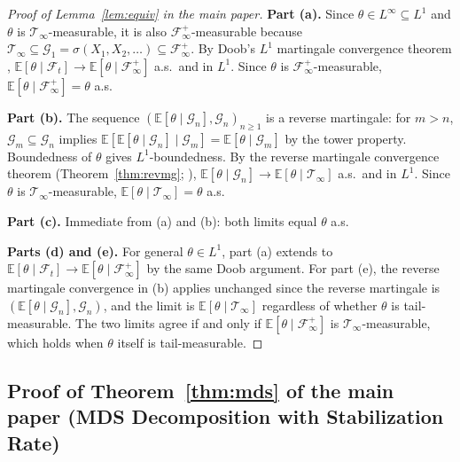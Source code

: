 \documentclass[bj,authoryear]{imsart}
\theoremstyle{plain}
\theoremstyle{definition}
\newcommand{\E}{\mathbb{E}}
\newcommand{\F}{\mathcal{F}}
\newcommand{\G}{\mathcal{G}}
\newcommand{\Tsig}{\mathcal{T}_\infty}
\newcommand{\given}{\mid}
\begin{document}
\begin{proof}[Proof of Lemma~\ref{lem:equiv} in the main paper]
  \textbf{Part (a).}
  Since $\theta \in L^\infty \subseteq L^1$ and $\theta$ is
  $\Tsig$-measurable, it is also $\F_\infty^+$-measurable because
  $\Tsig \subseteq \G_1 = \sigma(X_1,X_2,\ldots) \subseteq \F_\infty^+$.
  By Doob's $L^1$ martingale convergence theorem \citep{doob1953stochastic},
  $\E[\theta\given\F_t] \to \E[\theta\given\F_\infty^+]$ a.s.\ and in $L^1$.
  Since $\theta$ is $\F_\infty^+$-measurable,
  $\E[\theta\given\F_\infty^+] = \theta$ a.s.

  \textbf{Part (b).}
  The sequence $(\E[\theta\given\G_n], \G_n)_{n\geq 1}$ is a reverse
  martingale: for $m > n$, $\G_m \subseteq \G_n$ implies
  $\E[\E[\theta\given\G_n]\given\G_m] = \E[\theta\given\G_m]$ by the
  tower property.
  Boundedness of $\theta$ gives $L^1$-boundedness.
  By the reverse martingale convergence theorem
  (Theorem~\ref{thm:revmg}; \citealt{doob1953stochastic}),
  $\E[\theta\given\G_n] \to \E[\theta\given\Tsig]$ a.s.\ and in $L^1$.
  Since $\theta$ is $\Tsig$-measurable, $\E[\theta\given\Tsig] = \theta$
  a.s.

  \textbf{Part (c).}
  Immediate from (a) and (b): both limits equal $\theta$ a.s.

  \textbf{Parts (d) and (e).}
  For general $\theta \in L^1$, part (a) extends to
  $\E[\theta\given\F_t]\to\E[\theta\given\F_\infty^+]$ by the same Doob
  argument.  For part (e), the reverse martingale convergence in (b)
  applies unchanged since the reverse martingale is
  $(\E[\theta\given\G_n], \G_n)$, and the limit is
  $\E[\theta\given\Tsig]$ regardless of whether $\theta$ is
  tail-measurable.  The two limits agree if and only if
  $\E[\theta\given\F_\infty^+]$ is $\Tsig$-measurable, which holds when
  $\theta$ itself is tail-measurable.
\end{proof}

\subsection{Proof of Theorem~\ref{thm:mds} of the main paper (MDS Decomposition with Stabilization Rate)}
\label{app:proof-thmmds}
\end{document}
